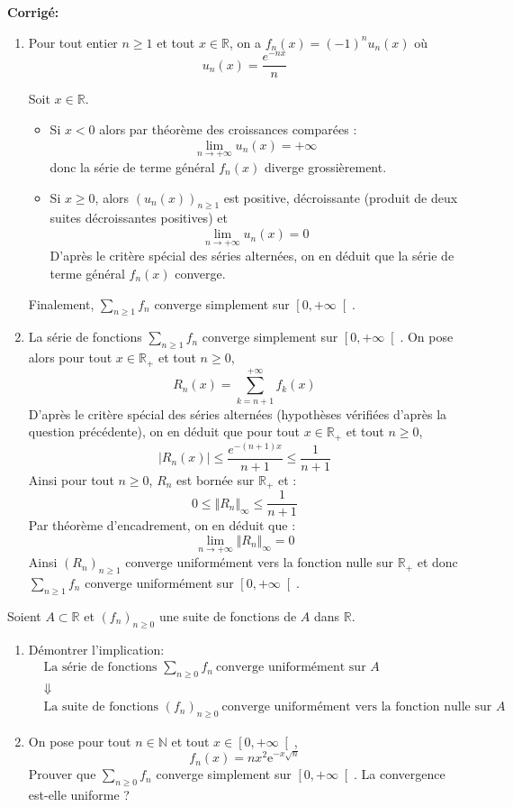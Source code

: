 \documentclass[a4paper,twoside,french,11pt]{VcCours}
\newcommand{\Sum}[2]{\sum_{#1}^{#2}}
\newcommand{\corr}{\textbf{Corrigé:}}
\begin{document}
\corr \begin{enumerate}

\item Pour tout entier $n \geq 1$ et tout $x \in \mathbb{R}$, on a $f_n(x)=(-1)^nu_n(x)$ où 
$$u_n(x)=\dfrac{e^{-nx}}{n} $$

Soit $x \in \mathbb{R}$.
\begin{itemize}
\item Si $x<0$ alors par théorème des croissances comparées :
$$\lim\limits_{n\to +\infty}^{} u_n(x) =+\infty$$
donc la série de terme général $f_n(x)$ diverge grossièrement.
\item Si $x\geq 0$, alors $(u_n(x))_{n \geq 1}$ est positive, décroissante (produit de deux suites décroissantes positives) et 
$$\lim\limits_{n\to +\infty}^{}u_n(x)=0$$
D'après le critère spécial des séries alternées, on en déduit que la série de terme général $f_n(x)$ converge.
\end{itemize}
Finalement, $\Sum{n\geq 1}{} f_n$ converge simplement sur $\left[ 0,+\infty\right[$.
\item La série de fonctions $\Sum{n\geq 1}{} f_n$ converge simplement sur $\left[ 0,+\infty\right[ $. On pose alors pour tout $x \in \mathbb{R}_+$ et tout $n \geq 0$, 
$$ R_n(x)=\sum\limits_{k=n+1}^{+\infty}f_k(x)$$
D'après le critère spécial des séries alternées (hypothèses vérifiées d'après la question précédente), on en déduit que pour tout $x \in \mathbb{R}_+$ et tout $n \geq 0$,
$$|R_n(x)|\leq \dfrac{e^{-(n+1)x}}{n+1} \leq \dfrac{1}{n+1}$$
Ainsi pour tout $n \geq 0$, $R_n$ est bornée sur $\mathbb{R}_+$ et :
$$0 \leq \Vert R_n \Vert_{\infty}\leq \dfrac{1}{n+1}$$
Par théorème d'encadrement, on en déduit que :
$$ \lim_{n \rightarrow + \infty} \Vert R_n \Vert_{\infty} = 0$$
Ainsi $(R_n)_{n \geq 1}$ converge uniformément vers la fonction nulle sur $\mathbb{R}_+$ et donc $\Sum{n\geq 1}{}f_n$ converge uniformément sur $\left[ 0,+\infty\right[ $.
\end{enumerate}

\medskip


\begin{Exercice}{} Soient $A\subset \mathbb{R}$ et $\left( f_{n}\right)_{n \geq 0}$ une suite de fonctions de $A$ dans $\mathbb{R}$.

\begin{enumerate}
\item Démontrer l'implication:
	\begin{eqnarray*}
	&  \text{La série de fonctions }\Sum{n\geq 0}{} f_n\ \text{converge uniformément sur $A$}& \\
	&\Downarrow &\\
	&\text{La suite de fonctions\ }\left( f_{n}\right) _{n \geq 0}\ \text{converge uniformément vers la fonction nulle sur $A$}&
	\end{eqnarray*}
\item
On pose pour tout $n\in\mathbb{N}$ et tout $x\in\left[ 0,+\infty\right[ $, 
$$f_n(x)=nx^2\mathrm{e}^{-x\sqrt{n}}$$
Prouver que $\Sum{n\geq 0}{} f_n$ converge simplement sur $\left[ 0,+\infty\right[$. La convergence est-elle uniforme ?
\end{enumerate}
\end{Exercice}
\end{document}
